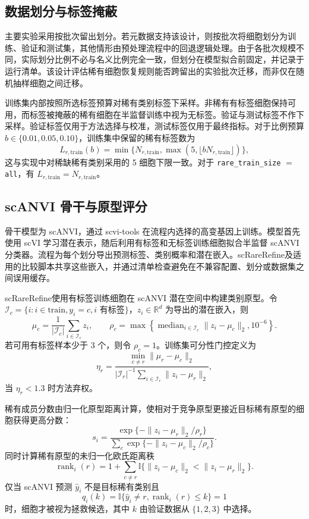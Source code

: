 \documentclass[pdflatex,sn-mathphys-num]{sn-jnl}
\theoremstyle{thmstyleone}%
\theoremstyle{thmstyletwo}%
\theoremstyle{thmstylethree}%
\newcommand{\method}{scRareRefine}
\newcommand{\rare}{r}
\newcommand{\rts}{\texttt{rare\_train\_size}}
\newcommand{\train}{\mathrm{train}}
\begin{document}
\subsection{数据划分与标签掩蔽}

主要实验采用按批次留出划分。若元数据支持该设计，则按批次将细胞划分为训练、验证和测试集，其他情形由预处理流程中的回退逻辑处理。由于各批次规模不同，实际划分比例不必与名义比例完全一致，但划分在模型拟合前固定，并记录于运行清单。该设计评估稀有细胞恢复规则能否跨留出的实验批次迁移，而非仅在随机抽样细胞之间迁移。

训练集内部按照所选标签预算对稀有类别标签下采样。非稀有有标签细胞保持可用，而标签被掩蔽的稀有细胞在半监督训练中视为无标签。验证与测试标签不作下采样。验证标签仅用于方法选择与校准，测试标签仅用于最终指标。对于比例预算 $b\in\{0.01,0.05,0.10\}$，训练集中保留的稀有标签数为
\[
L_{\rare,\train}(b)=\min\{N_{\rare,\train},\max(5,\lfloor bN_{\rare,\train}\rfloor)\},
\]
这与实现中对稀缺稀有类别采用的 5 细胞下限一致。对于 \rts{} $=$ \texttt{all}，有 $L_{\rare,\train}=N_{\rare,\train}$。

\subsection{scANVI 骨干与原型评分}

骨干模型为 scANVI，通过 scvi-tools 在流程内选择的高变基因上训练。模型首先使用 scVI 学习潜在表示，随后利用有标签和无标签训练细胞拟合半监督 scANVI 分类器。流程为每个划分导出预测标签、类别概率和潜在嵌入。\method 及适用的比较脚本共享这些嵌入，并通过清单检查避免在不兼容配置、划分或数据集之间误用缓存。

\method 使用有标签训练细胞在 scANVI 潜在空间中构建类别原型。令 $\mathcal{I}_c=\{i:i\in\train,y_i=c,i\text{ 有标签}\}$，$z_i\in\mathbb{R}^d$ 为导出的潜在嵌入，则
\[
\mu_c=\frac{1}{|\mathcal{I}_c|}\sum_{i\in\mathcal{I}_c}z_i,\qquad
\rho_c=\max\left\{\operatorname{median}_{i\in\mathcal{I}_c}\|z_i-\mu_c\|_2,10^{-6}\right\}.
\]
若可用有标签样本少于 3 个，则令 $\rho_c=1$。训练集可分性门控定义为
\[
\eta_\rare=\frac{\min_{c\ne\rare}\|\mu_\rare-\mu_c\|_2}
{|\mathcal{I}_\rare|^{-1}\sum_{i\in\mathcal{I}_\rare}\|z_i-\mu_\rare\|_2},
\]
当 $\eta_\rare<1.3$ 时方法弃权。

稀有成员分数由归一化原型距离计算，使相对于竞争原型更接近目标稀有原型的细胞获得更高分数：
\[
s_i=\frac{\exp\{-\|z_i-\mu_\rare\|_2/\rho_\rare\}}
{\sum_c\exp\{-\|z_i-\mu_c\|_2/\rho_c\}}.
\]
同时计算稀有原型的未归一化欧氏距离秩
\[
\operatorname{rank}_i(\rare)=1+\sum_{c\ne\rare}\mathbb{I}\{\|z_i-\mu_c\|_2<\|z_i-\mu_\rare\|_2\}.
\]
仅当 scANVI 预测 $\hat y_i$ 不是目标稀有类别且
\[
q_i(k)=\mathbb{I}\{\hat y_i\ne\rare,\operatorname{rank}_i(\rare)\le k\}=1
\]
时，细胞才被视为拯救候选，其中 $k$ 由验证数据从 $\{1,2,3\}$ 中选择。
\end{document}
